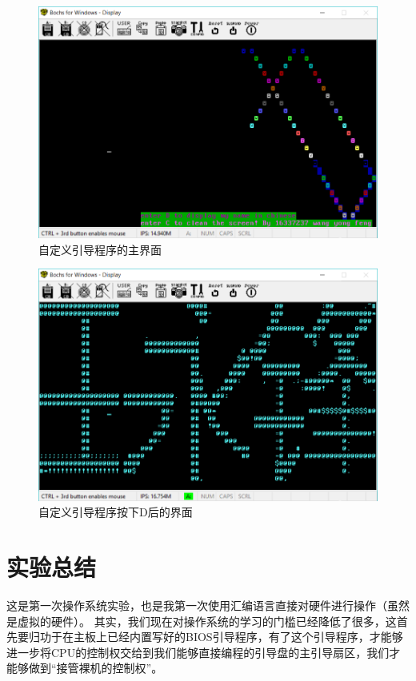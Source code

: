 \documentclass[forprint]{WHUBachelor}
\begin{document}
\begin{figure}[htp]
  \centering
  \includegraphics[width=16cm]{"./figure/main_screen.png"}
  \caption{自定义引导程序的主界面}
  \label{fig:main_screen}
\end{figure}

\begin{figure}[htp]
  \centering
  \includegraphics[width=16cm]{"./figure/main_screen2.png"}
  \caption{自定义引导程序按下D后的界面}
  \label{fig:main_screen2}
\end{figure}


\chapter{实验总结}

这是第一次操作系统实验，也是我第一次使用汇编语言直接对硬件进行操作（虽然是虚拟的硬件）。
其实，我们现在对操作系统的学习的门槛已经降低了很多，这首先要归功于在主板上已经内置写好的BIOS引导程序，有了这个引导程序，才能够进一步将CPU的控制权交给到我们能够直接编程的引导盘的主引导扇区，我们才能够做到“接管裸机的控制权”。
\end{document}
